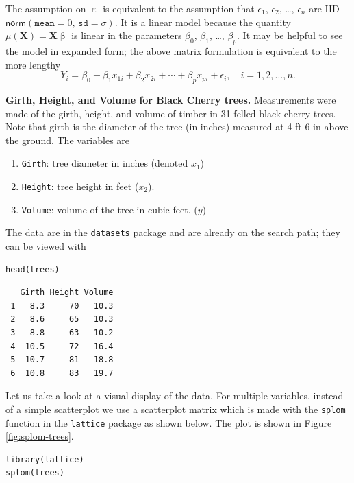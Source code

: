\documentclass[captions=tableheading]{scrbook}
\begin{document}
The assumption on \(\upepsilon\) is equivalent to the assumption that \(\epsilon_{1}\), \(\epsilon_{2}\), \ldots{}, \(\epsilon_{n}\) are IID \(\mathsf{norm}(\mathtt{mean}=0,\,\mathtt{sd}=\sigma)\). It is a linear model because the quantity \(\mu(\mathbf{X})=\mathbf{X}\upbeta\) is linear in the parameters \(\beta_{0}\), \(\beta_{1}\), \ldots{}, \(\beta_{p}\). It may be helpful to see the model in expanded form; the above matrix formulation is equivalent to the more lengthy
\begin{equation} 
Y_{i}=\beta_{0}+\beta_{1}x_{1i}+\beta_{2}x_{2i}+\cdots+\beta_{p}x_{pi}+\epsilon_{i},\quad i=1,2,\ldots,n.
\end{equation}

\begin{example}
\textbf{Girth, Height, and Volume for Black Cherry trees.} 
Measurements were made of the girth, height, and volume of timber in 31 felled black cherry trees. Note that girth is the diameter of the tree (in inches) measured at 4 ft 6 in above the ground. The variables are

\begin{enumerate}
\item \texttt{Girth}: tree diameter in inches (denoted \(x_{1}\))
\item \texttt{Height}: tree height in feet (\(x_{2}\)).
\item \texttt{Volume}: volume of the tree in cubic feet. (\(y\))
\end{enumerate}

The data are in the \texttt{datasets} package and are already on the search path; they can be viewed with


\begin{verbatim}
head(trees)
\end{verbatim}

\begin{verbatim}
   Girth Height Volume
 1   8.3     70   10.3
 2   8.6     65   10.3
 3   8.8     63   10.2
 4  10.5     72   16.4
 5  10.7     81   18.8
 6  10.8     83   19.7
\end{verbatim}

Let us take a look at a visual display of the data. For multiple variables, instead of a simple scatterplot we use a scatterplot matrix which is made with the \texttt{splom} function in the \texttt{lattice} package \cite{Sarkarlattice} as shown below. The plot is shown in Figure \ref{fig:splom-trees}.


\begin{verbatim}
library(lattice)
splom(trees)
\end{verbatim}




\end{example}
\end{document}
